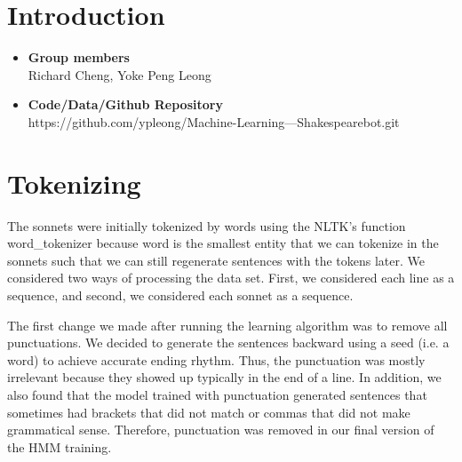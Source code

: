 \newif\ifshowsolutions
\showsolutionsfalse


\renewcommand{\headrulewidth}{0.4pt}



\pagestyle{fancy}

\section{Introduction}
\medskip
\begin{itemize}

    \item \textbf{Group members} \\
    Richard Cheng, Yoke Peng Leong
    
    \item \textbf{Code/Data/Github Repository} \\
    https://github.com/ypleong/Machine-Learning---Shakespearebot.git

\end{itemize}

\section{Tokenizing}

\medskip

The sonnets were initially tokenized by words using the NLTK's function word_tokenizer because word is the smallest entity that we can tokenize in the sonnets such that we can still regenerate sentences with the tokens later. We considered two ways of processing the data set. First, we considered each line as a sequence, and second, we considered each sonnet as a sequence.

The first change we made after running the learning algorithm was to remove all punctuations. We decided to generate the sentences backward using a seed (i.e. a word) to achieve accurate ending rhythm. Thus, the punctuation was mostly irrelevant because they showed up typically in the end of a line. In addition, we also found that the model trained with punctuation generated sentences that sometimes had brackets that did not match or commas that did not make grammatical sense. Therefore, punctuation was removed in our final version of the HMM training.

